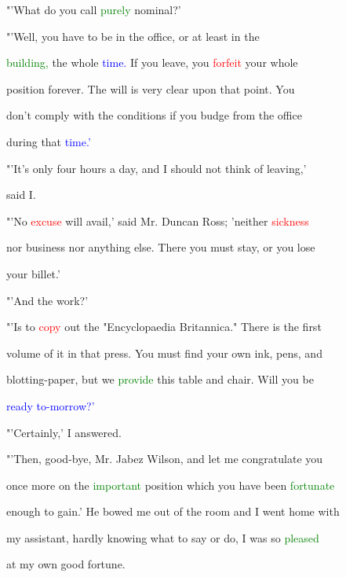  "'What do you call \textcolor{green}{purely} nominal?'



 "'Well, you have to be in the office, or at least in the

 \textcolor{green}{building,} the whole \textcolor{blue}{time.} If you \textcolor{BurntOrange}{leave,} you \textcolor{red}{forfeit} your whole

 position forever. The will is very clear upon that point. You

 don't comply with the conditions if you budge from the office

 during that \textcolor{blue}{time.'}



 "'It's only four hours a day, and I should not think of \textcolor{BurntOrange}{leaving,'}

 said I.



 "'No \textcolor{red}{excuse} will avail,' said Mr. Duncan Ross; 'neither \textcolor{red}{sickness}

 nor business nor anything else. There you must stay, or you \textcolor{BurntOrange}{lose}

 your billet.'



 "'And the work?'



 "'Is to \textcolor{red}{copy} out the "Encyclopaedia Britannica." There is the first

 volume of it in that press. You must find your own ink, pens, and

 blotting-paper, but we \textcolor{green}{provide} this table and chair. Will you be

 \textcolor{blue}{ready} \textcolor{blue}{to-morrow?'}



 "'Certainly,' I answered.



 "'Then, good-bye, Mr. Jabez Wilson, and let me congratulate you

 once more on the \textcolor{green}{important} position which you have been \textcolor{green}{fortunate}

 enough to \textcolor{BurntOrange}{gain.'} He bowed me out of the room and I went home with

 my assistant, hardly knowing what to say or do, I was so \textcolor{green}{pleased}

 at my own \textcolor{BurntOrange}{good} \textcolor{BurntOrange}{fortune.}



